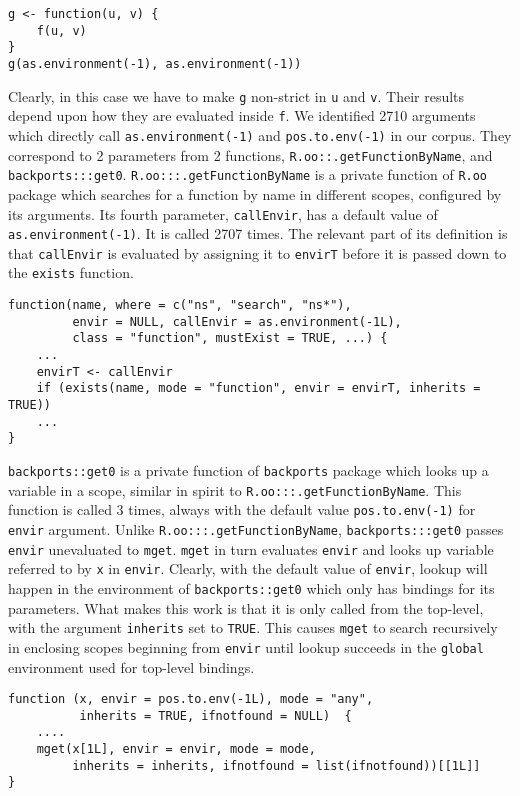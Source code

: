 \documentclass[review,nonacm,screen,acmsmall,anonymous=true]{acmart}
\newcommand{\code}[1]{\lstinline |#1|\xspace}
\begin{document}
\begin{lstlisting}
g <- function(u, v) {
    f(u, v)
}
g(as.environment(-1), as.environment(-1))
\end{lstlisting}
%
Clearly, in this case we have to make \code{g} non-strict in \code{u} and
\code{v}. Their results depend upon how they are evaluated inside \code{f}.
%
We identified 2710 arguments which directly call \code{as.environment(-1)} and
\code{pos.to.env(-1)} in our corpus. They correspond to 2 parameters from 2
functions, \code{R.oo::.getFunctionByName}, and \code{backports:::get0}.
%
\code{R.oo:::.getFunctionByName} is a private function of \code{R.oo} package
which searches for a function by name in different scopes, configured by its
arguments. Its fourth parameter, \code{callEnvir}, has a default value of
\code{as.environment(-1)}. It is called 2707 times. The relevant part of its
definition is that \code{callEnvir} is evaluated by assigning it to
\code{envirT} before it is passed down to the \code{exists} function.
%
\begin{lstlisting}
function(name, where = c("ns", "search", "ns*"),
         envir = NULL, callEnvir = as.environment(-1L),
         class = "function", mustExist = TRUE, ...) {
    ...
    envirT <- callEnvir
    if (exists(name, mode = "function", envir = envirT, inherits = TRUE))
    ...
}
\end{lstlisting}
%
\code{backports::get0} is a private function of \code{backports} package which
looks up a variable in a scope, similar in spirit to
\code{R.oo:::.getFunctionByName}. This function is called 3 times, always with
the default value \code{pos.to.env(-1)} for \code{envir} argument. Unlike
\code{R.oo:::.getFunctionByName}, \code{backports:::get0} passes \code{envir}
unevaluated to \code{mget}. \code{mget} in turn evaluates \code{envir} and looks
up variable referred to by \code{x} in \code{envir}. Clearly, with the default
value of \code{envir}, lookup will happen in the environment of
\code{backports::get0} which only has bindings for its parameters. What makes
this work is that it is only called from the top-level, with the argument
\code{inherits} set to \code{TRUE}. This causes \code{mget} to search
recursively in enclosing scopes beginning from \code{envir} until lookup
succeeds in the \code{global} environment used for top-level bindings.
%
\begin{lstlisting}
function (x, envir = pos.to.env(-1L), mode = "any",
          inherits = TRUE, ifnotfound = NULL)  {
    ....
    mget(x[1L], envir = envir, mode = mode,
         inherits = inherits, ifnotfound = list(ifnotfound))[[1L]]
}
\end{lstlisting}
\end{document}

